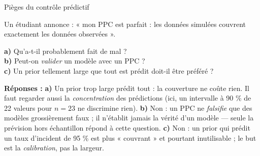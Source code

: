 \begin{frame}{Pièges du contrôle prédictif}
\begin{qbox}
Un étudiant annonce : « mon PPC est parfait : les données simulées couvrent exactement
les données observées ».
\vspace{1mm}

\textbf{a)} Qu'a-t-il probablement fait de mal ? \\[1mm]
\textbf{b)} Peut-on \emph{valider} un modèle avec un PPC ? \\[1mm]
\textbf{c)} Un prior tellement large que tout est prédit doit-il être préféré ?
\vspace{1.5mm}

\textcolor{byBlue}{\textbf{Réponses :}}
\textbf{a)} Un prior trop large prédit tout : la couverture ne coûte rien.
Il faut regarder aussi la \emph{concentration} des prédictions
(ici, un intervalle à 90 \% de 22 valeurs pour $n=23$ ne discrimine rien).
\quad
\textbf{b)} Non : un PPC ne \emph{falsifie} que des modèles grossièrement faux ;
il n'établit jamais la vérité d'un modèle — seule la prévision hors échantillon
répond à cette question.
\quad
\textbf{c)} Non : un prior qui prédit un taux d'incident de 95 \% est plus
« couvrant » et pourtant inutilisable ; le but est la \emph{calibration}, pas la
largeur.
\end{qbox}
\end{frame}

